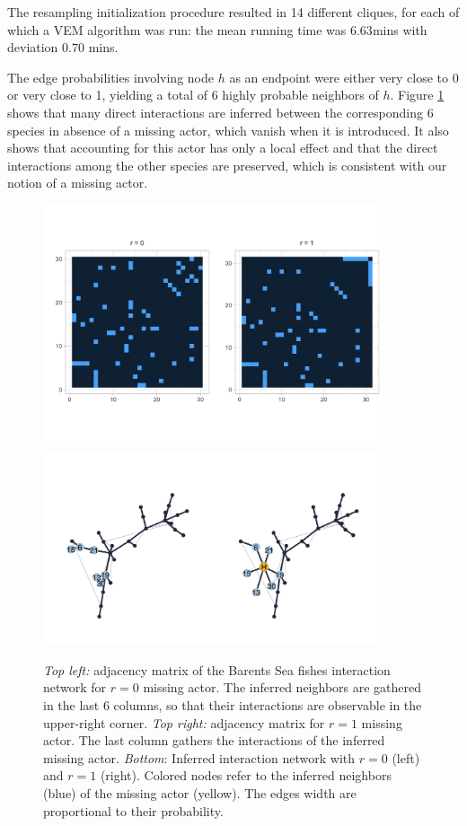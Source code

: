 The resampling initialization procedure resulted in 14 different cliques, for each of which a VEM algorithm was run: the mean running time was $6.63$mins with deviation $0.70$ mins. 

The edge probabilities involving node $h$ as an endpoint were either very close to 0 or very close to 1, yielding a total of 6 highly probable neighbors of $h$. Figure \ref{fig:barents_adj} shows that many direct interactions are inferred between the corresponding 6 species in absence of a missing actor, which vanish when it is introduced. It also shows that accounting for this actor has only a local effect and that the direct interactions among the other species are preserved, which is consistent with our notion of a missing actor.

\begin{figure}
    \centering
    \includegraphics[width=10cm]{figs/Barents_mat_comp.png} \\\vspace{-2cm}
    \includegraphics[width=10cm]{figs/Barents_net_comp3.png}
    \caption{\textit{Top left:} adjacency matrix of the Barents Sea fishes interaction network for $r=0$  missing actor. The inferred neighbors are gathered in the last 6 columns, so that their interactions are observable in the upper-right corner. \textit{Top right:} adjacency matrix for $r=1$  missing actor. The last column gathers the interactions of the inferred missing actor. \textit{Bottom}: Inferred interaction network with $r=0$ (left) and $r=1$ (right). Colored nodes refer to the inferred neighbors (blue) of the missing actor (yellow). The edges width are proportional to their probability.}
    \label{fig:barents_adj}
\end{figure}


